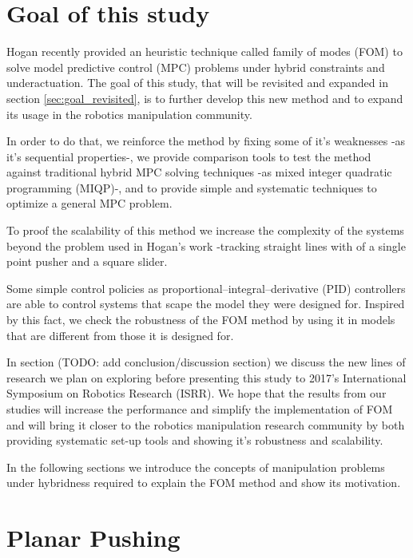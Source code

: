 \documentclass[12,twoside]{TFG-GM}
\theoremstyle{definition}
\theoremstyle{remark}
\begin{document}
\maketitle

                                                                      
\section{Goal of this study}
\label{briefgoal}
Hogan \cite{fom} recently provided an heuristic technique called family of modes (FOM) to solve model predictive control (MPC) problems under hybrid constraints and underactuation. The goal of this study, that will be revisited and expanded in section \ref{sec:goal_revisited}, is to further develop this new method and to expand its usage in the robotics manipulation community.

In order to do that, we reinforce the method by fixing some of it's weaknesses -as it's sequential properties-, we provide comparison tools to test the method against traditional hybrid MPC solving techniques -as mixed integer quadratic programming (MIQP)-, and to provide simple and systematic techniques to optimize a general MPC problem.

To proof the scalability of this method we increase the complexity of the systems beyond the problem used in Hogan's work -tracking straight lines with of a single point pusher and a square slider.

Some simple control policies as proportional–integral–derivative (PID) controllers are able to control systems that scape the model they were designed for. Inspired by this fact, we check the robustness of the FOM method by using it in models that are different from those it is designed for.

In section (TODO: add conclusion/discussion section) we discuss the new lines of research we plan on exploring before presenting this study to 2017's International Symposium on Robotics Research (ISRR). We hope that the results from our studies will increase the performance and simplify the implementation of FOM and will bring it closer to the robotics manipulation research community by both providing systematic set-up tools and showing it's robustness and scalability.

In the following sections we introduce the concepts of manipulation problems under hybridness required to explain the FOM method and show its motivation.

\section{Planar Pushing}
\label{sec:intro}
\end{document}
